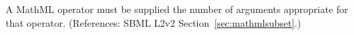 A MathML operator must be supplied the number of arguments appropriate for
that operator.  (References: SBML L2v2 Section~\ref{sec:mathmlsubset}.)
